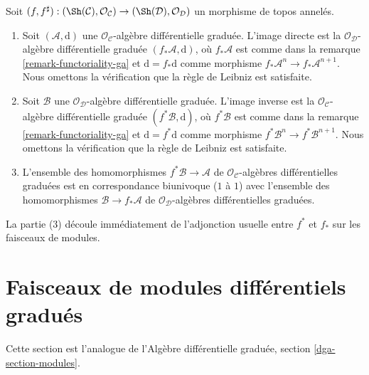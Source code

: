 \begin{remark}
\label{remark-functoriality-dga} Soit
$(f, f^\sharp) : (\Sh(\mathcal{C}), \mathcal{O}_\mathcal{C})
\to (\Sh(\mathcal{D}), \mathcal{O}_\mathcal{D})$ un morphisme
de topos annelés.
\begin{enumerate}
\item Soit $(\mathcal{A}, \text{d})$ une
$\mathcal{O}_\mathcal{C}$-algèbre différentielle graduée. L'image directe est la
$\mathcal{O}_\mathcal{D}$-algèbre différentielle graduée
$(f_*\mathcal{A}, \text{d})$, où $f_*\mathcal{A}$ est comme dans la remarque
\ref{remark-functoriality-ga} et
$\text{d} = f_*\text{d}$ comme morphisme $f_*\mathcal{A}^n \to f_*\mathcal{A}^{n + 1}$. Nous omettons
la vérification que la règle de Leibniz est satisfaite.
\item Soit $\mathcal{B}$ une
$\mathcal{O}_\mathcal{D}$-algèbre différentielle graduée. L'image inverse est la
$\mathcal{O}_\mathcal{C}$-algèbre différentielle graduée
$(f^*\mathcal{B}, \text{d})$, où $f^*\mathcal{B}$ est comme dans la remarque
\ref{remark-functoriality-ga} et
$\text{d} = f^*\text{d}$ comme morphisme $f^*\mathcal{B}^n \to f^*\mathcal{B}^{n + 1}$. Nous omettons
la vérification que la règle de Leibniz est satisfaite.
\item L'ensemble des homomorphismes $f^*\mathcal{B} \to \mathcal{A}$ de
$\mathcal{O}_\mathcal{C}$-algèbres différentielles graduées est en
correspondance biunivoque ($1$ à $1$) avec l'ensemble des homomorphismes
$\mathcal{B} \to f_*\mathcal{A}$ de
$\mathcal{O}_\mathcal{D}$-algèbres différentielles graduées.
\end{enumerate} La
partie (3) découle immédiatement de l'adjonction usuelle entre $f^*$ et $f_*$ sur les
faisceaux de modules.
\end{remark}
















\section{Faisceaux de modules différentiels gradués}
\label{section-modules}

\noindent
Cette section est l'analogue de
l'Algèbre différentielle graduée, section \ref{dga-section-modules}.

